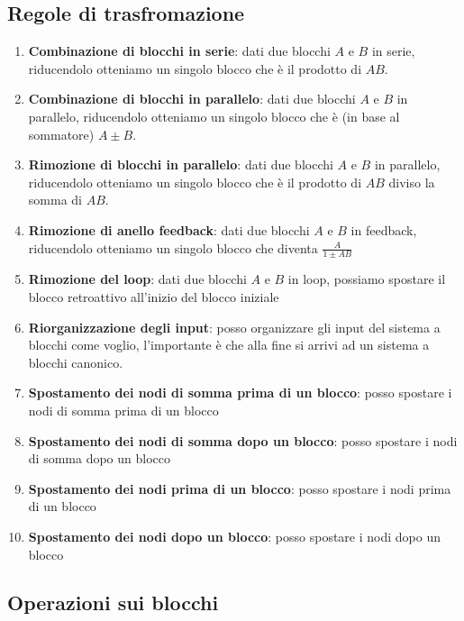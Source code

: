 \documentclass[a4paper]{article}
\begin{document}
\subsection{Regole di trasfromazione}

\begin{enumerate}
    \item \textbf{Combinazione di blocchi in serie}: dati due blocchi $A$ e $B$ in serie, riducendolo otteniamo un singolo blocco che è il prodotto di $AB$.
    \item \textbf{Combinazione di blocchi in parallelo}: dati due blocchi $A$ e $B$ in parallelo, riducendolo otteniamo un singolo blocco che è (in base al sommatore) $A\pm B$.
    \item \textbf{Rimozione di blocchi in parallelo}: dati due blocchi $A$ e $B$ in parallelo, riducendolo otteniamo un singolo blocco che è il prodotto di $AB$ diviso la somma di $AB$.
    \item \textbf{Rimozione di anello feedback}: dati due blocchi $A$ e $B$ in feedback, riducendolo otteniamo un singolo blocco che diventa $\frac{A}{1 \pm AB}$
    \item \textbf{Rimozione del loop}: dati due blocchi $A$ e $B$ in loop, possiamo spostare il blocco retroattivo all'inizio del blocco iniziale
    \item \textbf{Riorganizzazione degli input}: posso organizzare gli input del sistema a blocchi come voglio, l'importante è che alla fine si arrivi ad un sistema a blocchi canonico.
    \item \textbf{Spostamento dei nodi di somma prima di un blocco}: posso spostare i nodi di somma prima di un blocco
    \item \textbf{Spostamento dei nodi di somma dopo un blocco}: posso spostare i nodi di somma dopo un blocco
    \item \textbf{Spostamento dei nodi prima di un blocco}: posso spostare i nodi prima di un blocco
    \item \textbf{Spostamento dei nodi dopo un blocco}: posso spostare i nodi dopo un blocco
\end{enumerate}

\subsection{Operazioni sui blocchi}
\end{document}
